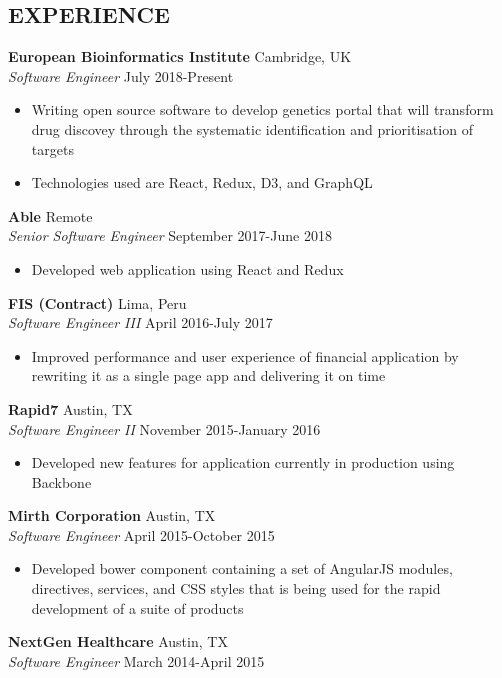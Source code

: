 \documentclass[line,margin,letterpaper]{res}
\begin{document}
\begin{resume}
\section{EXPERIENCE}
  {\bf European Bioinformatics Institute} \hfill Cambridge, UK \\
  \emph{Software Engineer} \hfill July 2018-Present
  \begin{itemize} \itemsep -2pt
    \item Writing open source software to develop genetics portal that will
    transform drug discovey through the systematic identification and
    prioritisation of targets
    \item Technologies used are React, Redux, D3, and GraphQL
  \end{itemize}
  {\bf Able} \hfill Remote \\
  \emph{Senior Software Engineer} \hfill September 2017-June 2018
  \begin{itemize} \itemsep -2pt
    \item Developed web application using React and Redux
  \end{itemize}
  {\bf FIS (Contract)} \hfill Lima, Peru \\
  \emph{Software Engineer III} \hfill April 2016-July 2017
  \begin{itemize} \itemsep -2pt
    \item Improved performance and user experience of financial application by
    rewriting it as a single page app and delivering it on time
  \end{itemize}
  {\bf Rapid7} \hfill Austin, TX \\
  \emph{Software Engineer II} \hfill November 2015-January 2016
  \begin{itemize} \itemsep -2pt
    \item Developed new features for application currently in production
    using Backbone
  \end{itemize}
  {\bf Mirth Corporation} \hfill Austin, TX \\
  \emph{Software Engineer} \hfill April 2015-October 2015
  \begin{itemize} \itemsep -2pt
    \item Developed bower component containing a set of AngularJS modules,
    directives, services, and CSS styles that is being used for the rapid
    development of a suite of products
  \end{itemize}
  {\bf NextGen Healthcare} \hfill Austin, TX \\
  \emph{Software Engineer} \hfill March 2014-April 2015

\end{resume}
\end{document}
